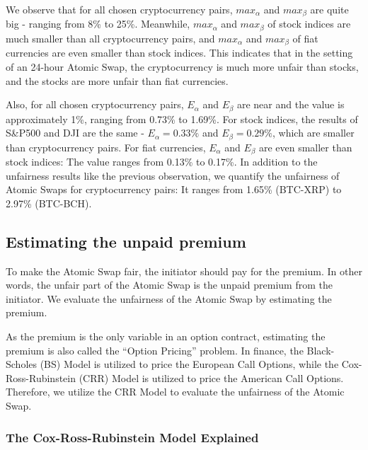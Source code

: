 We observe that for all chosen cryptocurrency pairs, $max_\alpha$ and $max_\beta$ are quite big - ranging from 8\% to 25\%.
Meanwhile, $max_\alpha$ and $max_\beta$ of stock indices are much smaller than all cryptocurrency pairs,
and $max_\alpha$ and $max_\beta$ of fiat currencies are even smaller than stock indices.
This indicates that in the setting of an 24-hour Atomic Swap, the cryptocurrency is much more unfair than stocks, and the stocks are more unfair than fiat currencies.

Also, for all chosen cryptocurrency pairs, $E_{\alpha}$ and $E_{\beta}$ are near and the value is approximately 1\%, ranging from 0.73\% to 1.69\%.
For stock indices, the results of S\&P500 and DJI are the same - $E_\alpha = 0.33\%$ and $E_\beta = 0.29\%$, which are smaller than cryptocurrency pairs.
For fiat currencies, $E_\alpha$ and $E_\beta$ are even smaller than stock indices: The value ranges from 0.13\% to 0.17\%.
In addition to the unfairness results like the previous observation, we quantify the unfairness of Atomic Swaps for cryptocurrency pairs: It ranges from  1.65\% (BTC-XRP) to 2.97\% (BTC-BCH).



















\subsection{Estimating the unpaid premium}

To make the Atomic Swap fair, the initiator should pay for the premium.
In other words, the unfair part of the Atomic Swap is the unpaid premium from the initiator.
We evaluate the unfairness of the Atomic Swap by estimating the premium.

As the premium is the only variable in an option contract, estimating the premium is also called the ``Option Pricing'' problem.
In finance, the Black-Scholes (BS) Model is utilized to price the European Call Options,
while the Cox-Ross-Rubinstein (CRR) Model is utilized to price the American Call Options.
Therefore, we utilize the CRR Model to evaluate the unfairness of the Atomic Swap.

\subsubsection{The Cox-Ross-Rubinstein Model Explained}

